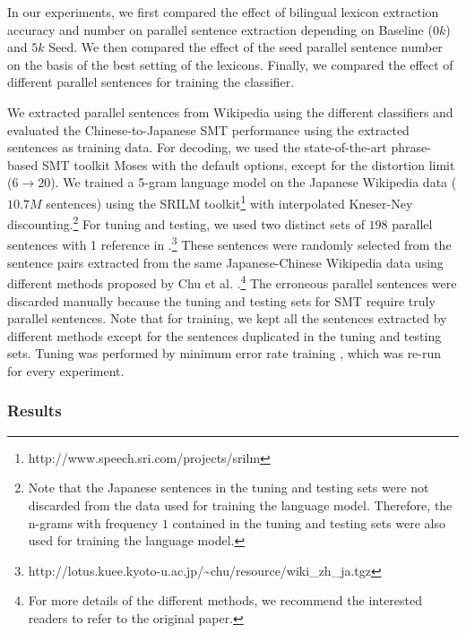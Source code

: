 \documentclass[english]{jnlp_1.4}
\begin{document}
In our experiments, we first compared the effect of bilingual lexicon extraction accuracy and number 
on parallel sentence extraction depending on Baseline ($0k$) and $5k$ Seed. We then compared the effect 
of the seed parallel sentence number on the basis of the best setting of the lexicons. Finally, we 
compared the effect of different parallel sentences for training the classifier.

We extracted parallel sentences from Wikipedia using the different classifiers and evaluated
the Chinese-to-Japanese SMT performance using the extracted sentences
as training data. For decoding, we
used the state-of-the-art phrase-based SMT toolkit Moses
\cite{koehn-EtAl:2007:PosterDemo} with the default options,
except for the distortion limit ($6\rightarrow20$).
We trained a 5-gram language model on the Japanese Wikipedia data ($10.7M$ sentences) using the SRILM
toolkit\footnote{http://www.speech.sri.com/projects/srilm}
with interpolated Kneser-Ney discounting.\footnote{Note that the Japanese sentences in the
    tuning and testing sets were not discarded from the data used for training the language model. 
    Therefore, the n-grams with frequency $1$ contained in the tuning and testing sets were also used
    for training the language model.}
For tuning and testing, we used two distinct sets of $198$ parallel sentences
with 1 reference in \cite{chu:2014:LREC}.\footnote{http://lotus.kuee.kyoto-u.ac.jp/\~{}chu/resource/wiki\_zh\_ja.tgz}
These sentences were randomly selected from the sentence pairs extracted from 
the same Japanese-Chinese Wikipedia data using different methods proposed by
Chu et al. \citeyear{chu:2014:LREC}.\footnote{For more details of the different methods, 
    we recommend the interested readers to refer to the original paper.}
The erroneous parallel sentences were discarded manually because the tuning and testing sets for SMT require
truly parallel sentences.
Note that for training, we kept all the sentences extracted by different methods
except for the sentences duplicated in the tuning and testing sets.
Tuning was performed by minimum error rate training \cite{och:2003:ACL},
which was re-run for every experiment.


\subsubsection{Results}
\end{document}
